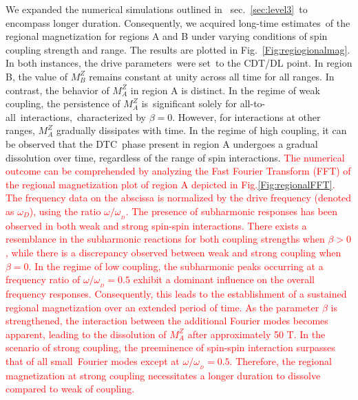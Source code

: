 \documentclass[%
nofootinbib,
reprint,
superscriptaddress,
amsmath,amssymb,showkeys,
aps,
prb,
]{revtex4-2}
\newcommand{\red}[1]{\textcolor{red}{#1}}
\begin{document}
	We expanded the numerical simulations outlined in  sec.~\ref{sec:level3} to encompass longer duration. Consequently, we acquired long-time estimates of the regional magnetization for regions A and B under varying conditions of spin coupling strength and range. The results are plotted in Fig.~\ref{Fig:regiogionalmag}. In both instances, the drive parameters were set to the CDT/DL point. In region B, the value of $M^Z_B$ remains constant at unity across all time for all ranges. In contrast, the behavior of $M^Z_A$ in region A is distinct. In the regime of weak coupling, the persistence of $M^Z_A$ is significant solely for all-to-all interactions, characterized by $\beta=0$. However, for interactions at other ranges, $M^Z_A$ gradually dissipates with time. In the regime of high coupling, it can be observed that the DTC phase present in region A undergoes a gradual dissolution over time, regardless of the range of spin interactions.\red{ The numerical outcome can be comprehended by analyzing the Fast Fourier Transform (FFT) of the regional magnetization plot of region A depicted in Fig.\ref{Fig:regionalFFT}. The frequency data on the abscissa is normalized by the drive frequency (denoted as $\omega_D$), using the ratio $\omega/\omega_{_{D}}$. The presence of subharmonic responses has been observed in both weak and strong spin-spin interactions. There exists a resemblance in the subharmonic reactions for both coupling strengths when $\beta>0$, while there is a discrepancy observed between weak and strong coupling when $\beta=0$. In the regime of low coupling, the subharmonic peaks occurring at a frequency ratio of $\omega/\omega_{_{D}}=0.5$ exhibit a dominant influence on the overall frequency responses. Consequently, this leads to the establishment of a sustained regional magnetization over an extended period of time. As the parameter $\beta$ is strengthened, the interaction between the additional Fourier modes becomes apparent, leading to the dissolution of $M^Z_A$ after approximately 50 T. In the scenario of strong coupling, the preeminence of spin-spin interaction surpasses that of all small Fourier modes except at  $\omega/\omega_{_{D}}=0.5$.  Therefore, the regional magnetization at strong coupling necessitates a longer duration to dissolve compared to weak of coupling.}
	
\end{document}
